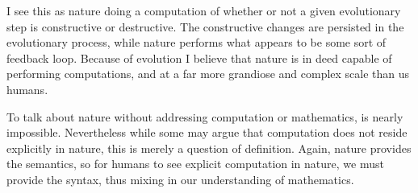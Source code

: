 I see this as nature doing a computation of whether or not a given evolutionary step is constructive or destructive.
The constructive changes are persisted in the evolutionary process, while nature performs what appears to be some sort of feedback loop.
Because of evolution I believe that nature is in deed capable of performing computations, and at a far more grandiose and complex scale than us humans.

\bigskip
To talk about nature without addressing computation or mathematics, is nearly impossible.
Nevertheless while some may argue that computation does not reside explicitly in nature, this is merely a question of definition.
Again, nature provides the semantics, so for humans to see explicit computation in nature, we must provide the syntax, thus mixing in our understanding of mathematics.
